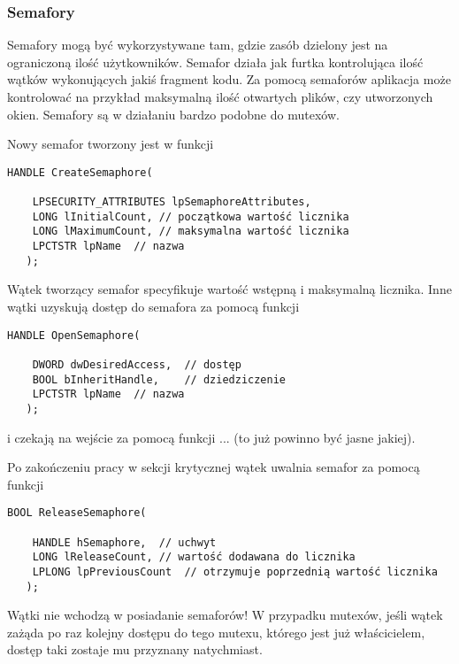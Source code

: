\subsubsection{Semafory}

Semafory mogą być wykorzystywane tam, gdzie zasób dzielony jest na ograniczoną ilość użytkowników. 
Semafor działa jak furtka kontrolująca ilość wątków wykonujących jakiś fragment kodu. 
Za pomocą semaforów aplikacja może kontrolować na przykład maksymalną ilość otwartych plików, 
czy utworzonych okien. Semafory są w działaniu bardzo podobne do mutexów. 

Nowy semafor tworzony jest w funkcji 

\begin{scriptsize}
\begin{verbatim}
HANDLE CreateSemaphore(

    LPSECURITY_ATTRIBUTES lpSemaphoreAttributes,	
    LONG lInitialCount,	// początkowa wartość licznika
    LONG lMaximumCount,	// maksymalna wartość licznika
    LPCTSTR lpName 	// nazwa
   );
\end{verbatim}
\end{scriptsize}

Wątek tworzący semafor specyfikuje wartość wstępną i maksymalną licznika. 
Inne wątki uzyskują dostęp do semafora za pomocą funkcji 

\begin{scriptsize}
\begin{verbatim}
HANDLE OpenSemaphore(

    DWORD dwDesiredAccess,	// dostęp
    BOOL bInheritHandle,	// dziedziczenie
    LPCTSTR lpName 	// nazwa
   );
\end{verbatim}
\end{scriptsize}

i czekają na wejście za pomocą funkcji ... (to już powinno być jasne jakiej). 

Po zakończeniu pracy w sekcji krytycznej wątek uwalnia semafor za pomocą funkcji 

\begin{scriptsize}
\begin{verbatim}
BOOL ReleaseSemaphore(

    HANDLE hSemaphore,	// uchwyt
    LONG lReleaseCount,	// wartość dodawana do licznika
    LPLONG lpPreviousCount 	// otrzymuje poprzednią wartość licznika
   );	
 \end{verbatim}
\end{scriptsize}

Wątki nie wchodzą w posiadanie semaforów! W przypadku mutexów, 
jeśli wątek zażąda po raz kolejny dostępu do tego mutexu, którego jest już właścicielem, 
dostęp taki zostaje mu przyznany natychmiast. 

